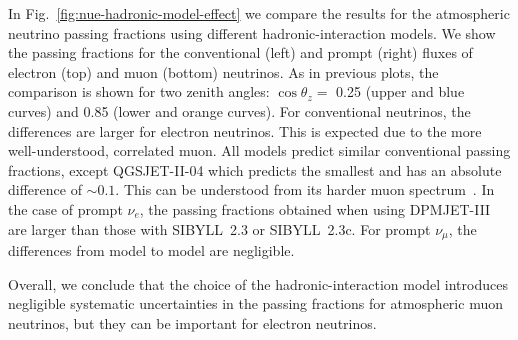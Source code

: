 \documentclass[aps,prd,showpacs,letterpaper,onecolumn,longbibliography,superscriptaddress,notitlepage,nofootinbib]{revtex4-1}%
\begin{document}
In Fig.~\ref{fig:nue-hadronic-model-effect} we compare the results for the atmospheric neutrino passing fractions using different hadronic-interaction models. We show the passing fractions for the conventional (left) and prompt (right) fluxes of electron (top) and muon (bottom) neutrinos. As in previous plots, the comparison is shown for two zenith angles: $\cos\theta_z = $ 0.25 (upper and blue curves) and 0.85 (lower and orange curves). For conventional neutrinos, the differences are larger for electron neutrinos. This is expected due to the more well-understood, correlated muon. All models predict similar conventional passing fractions, except QGSJET-II-04 which predicts the smallest and has an absolute difference of $\sim 0.1$. This can be understood from its harder muon spectrum~\cite{Riehn:2017mfm}. In the case of prompt $\nu_e$, the passing fractions obtained when using DPMJET-III are larger than those with SIBYLL~2.3 or SIBYLL~2.3c. For prompt $\nu_\mu$, the differences from model to model are negligible.

Overall, we conclude that the choice of the hadronic-interaction model introduces negligible systematic uncertainties in the passing fractions for atmospheric muon neutrinos, but they can be important for electron neutrinos.
\end{document}
